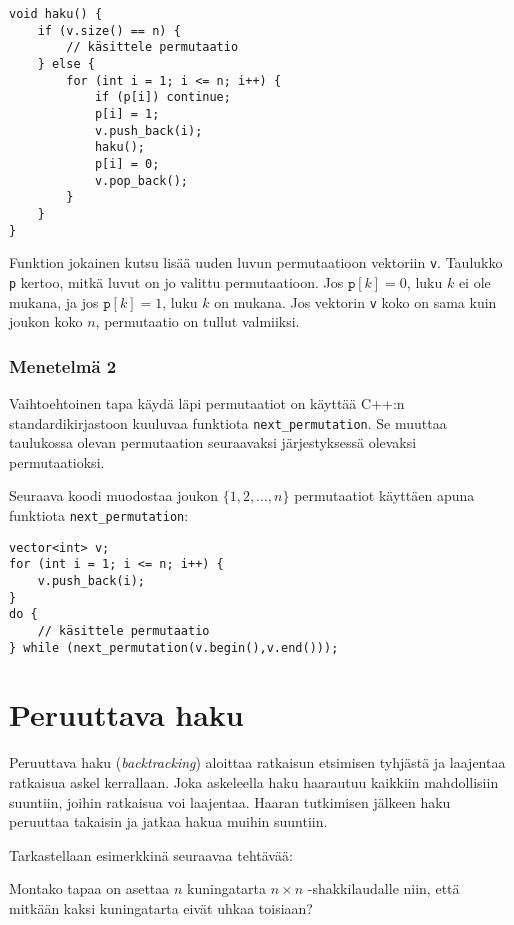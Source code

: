 \begin{lstlisting}
void haku() {
    if (v.size() == n) {
        // käsittele permutaatio
    } else {
        for (int i = 1; i <= n; i++) {
            if (p[i]) continue;
            p[i] = 1;
            v.push_back(i);
            haku();
            p[i] = 0;
            v.pop_back();
        }
    }
}
\end{lstlisting}

Funktion jokainen kutsu lisää uuden
luvun permutaatioon vektoriin \texttt{v}.
Taulukko \texttt{p} kertoo, mitkä luvut on jo
valittu permutaatioon.
Jos $\texttt{p}[k]=0$, luku $k$ ei ole mukana,
ja jos $\texttt{p}[k]=1$, luku $k$ on mukana.
Jos vektorin \texttt{v} koko on sama kuin
joukon koko $n$, permutaatio on tullut valmiiksi.

\subsubsection{Menetelmä 2}

Vaihtoehtoinen tapa käydä läpi permutaatiot
on käyttää C++:n standardikirjastoon kuuluvaa
funktiota \texttt{next\_permutation}.
Se muuttaa taulukossa olevan permutaation
seuraavaksi järjestyksessä olevaksi permutaatioksi.

Seuraava koodi muodostaa joukon $\{1,2,\ldots,n\}$
permutaatiot käyttäen apuna funktiota \texttt{next\_permutation}:

\begin{lstlisting}
vector<int> v;
for (int i = 1; i <= n; i++) {
    v.push_back(i);
}
do {
    // käsittele permutaatio
} while (next_permutation(v.begin(),v.end()));
\end{lstlisting}

\section{Peruuttava haku}

Peruuttava haku (\textit{backtracking})
aloittaa ratkaisun etsimisen tyhjästä
ja laajentaa ratkaisua askel kerrallaan.
Joka askeleella haku haarautuu kaikkiin
mahdollisiin suuntiin, joihin ratkaisua voi laajentaa.
Haaran tutkimisen jälkeen haku peruuttaa takaisin
ja jatkaa hakua muihin suuntiin.

Tarkastellaan esimerkkinä seuraavaa tehtävää:

\begin{task}
Montako tapaa on asettaa $n$ kuningatarta
$n \times n$ -shakkilaudalle niin,
että mitkään kaksi kuningatarta eivät uhkaa toisiaan?
\end{task}

